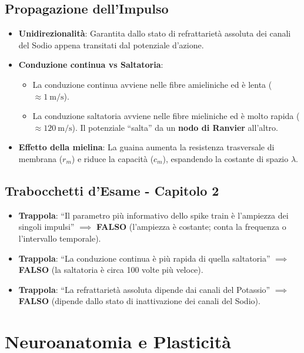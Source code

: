 \documentclass[10pt, letterpaper]{report}
\begin{document}
\section{Propagazione dell'Impulso}
\begin{itemize}
    \item \textbf{Unidirezionalità}: Garantita dallo stato di refrattarietà assoluta dei canali del Sodio appena transitati dal potenziale d'azione.
    \item \textbf{Conduzione continua vs Saltatoria}:
    \begin{itemize}
        \item La conduzione continua avviene nelle fibre amieliniche ed è lenta (\(\approx 1\ \text{m/s}\)).
        \item La conduzione saltatoria avviene nelle fibre mieliniche ed è molto rapida (\(\approx 120\ \text{m/s}\)). Il potenziale ``salta'' da un \textbf{nodo di Ranvier} all'altro.
    \end{itemize}
    \item \textbf{Effetto della mielina}: La guaina aumenta la resistenza trasversale di membrana (\(r_m\)) e riduce la capacità (\(c_m\)), espandendo la costante di spazio \(\lambda\).
\end{itemize}

\section*{Trabocchetti d'Esame - Capitolo 2}
\begin{itemize}
    \item \textbf{Trappola}: ``Il parametro più informativo dello spike train è l'ampiezza dei singoli impulsi'' \(\implies\) \textbf{FALSO} (l'ampiezza è costante; conta la frequenza o l'intervallo temporale).
    \item \textbf{Trappola}: ``La conduzione continua è più rapida di quella saltatoria'' \(\implies\) \textbf{FALSO} (la saltatoria è circa 100 volte più veloce).
    \item \textbf{Trappola}: ``La refrattarietà assoluta dipende dai canali del Potassio'' \(\implies\) \textbf{FALSO} (dipende dallo stato di inattivazione dei canali del Sodio).
\end{itemize}

\chapter{Neuroanatomia e Plasticità}
\end{document}
